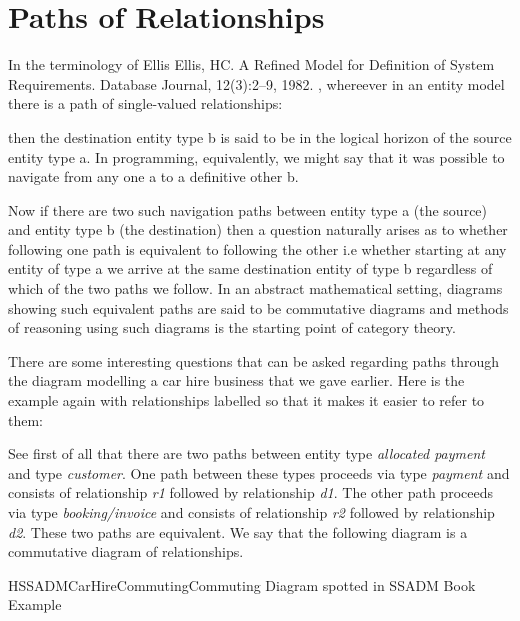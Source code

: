 


\section{Paths of Relationships}
\label{PathsofRelationships}


\mynote
In the terminology of Ellis Ellis, HC. A Refined Model for Definition of System Requirements. Database Journal, 12(3):2--9, 1982. , whereever in an entity model there is a path of single-valued relationships:
\begin{center}

\end{center}
then the destination entity type b is said to be in the logical horizon of the source entity type a. In programming, equivalently, we might say that it was possible to navigate from any one a to a definitive other b. 


\mynote
Now if there are two such navigation paths between entity type a (the source) and entity type b (the destination) then a question naturally arises as to whether following one path is equivalent to following the other i.e whether starting at any entity of type a we arrive at the same destination entity of type b regardless of which of the two paths we follow. In an abstract mathematical setting, diagrams showing such equivalent paths are said to be commutative diagrams and methods of reasoning using such diagrams is the starting point of category theory.

\mynote
There are some interesting questions that can be asked regarding paths through the diagram modelling a car hire business that we gave earlier. Here is the example again with relationships labelled so that it makes it easier to refer to them:

See first of all that there are two paths between entity type \textit{allocated payment} and type \textit{customer}.
One path between these types proceeds via type \textit{payment} and consists of relationship \textit{r1} followed by relationship \textit{d1}. The other path proceeds via type \textit{booking/invoice} and consists of relationship \textit{r2} followed by relationship \textit{d2}.  
These two paths are equivalent. We say that the following diagram is a commutative diagram of relationships. 
\begin{erboxedFigure}{H}{SSADMCarHireCommuting}{Commuting Diagram spotted in SSADM Book Example}

\end{erboxedFigure}

